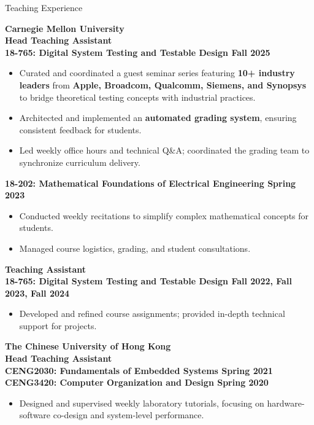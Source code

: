 
\begin{rSection}{Teaching Experience}

    {\bf \textcolor{CUHKblue}{Carnegie Mellon University}}               \\
    {\bf {\textcolor{CUHKblue}{Head Teaching Assistant} \\ 18-765: Digital System Testing and Testable Design } \hfill{Fall 2025}}
    \begin{itemize}[noitemsep,topsep=-5pt]
        \item Curated and coordinated a guest seminar series featuring \textbf{10+ industry leaders} from \textbf{Apple, Broadcom, Qualcomm, Siemens, and Synopsys} to bridge theoretical testing concepts with industrial practices.
        \item Architected and implemented an \textbf{automated grading system}, ensuring consistent feedback for students.
        \item Led weekly office hours and technical Q\&A; coordinated the grading team to synchronize curriculum delivery.
    \end{itemize}
    {\bf {18-202: Mathematical Foundations of Electrical Engineering } \hfill{Spring 2023}}
    \begin{itemize}[noitemsep,topsep=-5pt]
        \item Conducted weekly recitations to simplify complex mathematical concepts for students.
        \item Managed course logistics, grading, and student consultations. 
    \end{itemize}
    {\bf {\textcolor{CUHKblue}{Teaching Assistant} \\ 18-765: Digital System Testing and Testable Design }  \hfill{Fall 2022, Fall 2023, Fall 2024}}
    \begin{itemize}[noitemsep,topsep=-5pt]
        \item Developed and refined course assignments; provided in-depth technical support for projects.
    \end{itemize} 

{\bf \textcolor{CUHKblue}{The Chinese University of Hong Kong}}               \\
{\bf {\textcolor{CUHKblue}{Head Teaching Assistant} \\ CENG2030: Fundamentals of Embedded Systems }  \hfill{Spring 2021}}\\
{\bf { CENG3420: Computer Organization and Design }  \hfill{Spring 2020}}
\begin{itemize}[noitemsep,topsep=-5pt]
    \item Designed and supervised weekly laboratory tutorials, focusing on hardware-software co-design and system-level performance. \\
\end{itemize} 



\end{rSection}
